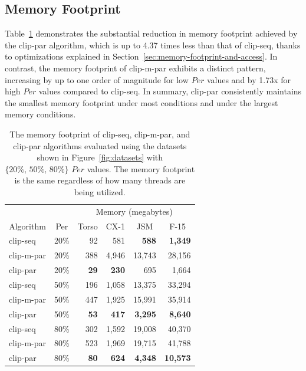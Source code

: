 \documentclass{egpubl}
\begin{document}
\subsection{Memory Footprint}

Table~\ref{tab:mem-footprint} demonstrates the substantial reduction in memory footprint achieved by the clip-par algorithm, which is up to 4.37 times less than that of clip-seq, thanks to optimizations explained in Section~\ref{sec:memory-footprint-and-access}. In contrast, the memory footprint of clip-m-par exhibits a distinct pattern, increasing by up to one order of magnitude for low $Per$ values and by 1.73x for high $Per$ values compared to clip-seq. In summary, clip-par consistently maintains the smallest memory footprint under most conditions and under the largest memory conditions.

\begin{table}[h]
\centering
\caption{The memory footprint of clip-seq, clip-m-par, and clip-par algorithms evaluated using the datasets shown in Figure~\ref{fig:datasets} with $\textit{\{20\%, 50\%, 80\%\}}$ $Per$ values. The memory footprint is the same regardless of how many threads are being utilized. }
\label{tab:mem-footprint}
\begin{tabular}{lc@{\quad}rrrr}
\toprule
\multicolumn{2}{l}{}                & \multicolumn{4}{c}{Memory (megabytes)}                                                                    \\
\multicolumn{1}{c}{Algorithm} & Per & \multicolumn{1}{c}{Torso} & \multicolumn{1}{c}{CX-1} & \multicolumn{1}{c}{JSM} & \multicolumn{1}{c}{F-15} \\
\midrule
clip-seq   & 20\% & 92        & 581        &\textbf{588}  &\textbf{1,349} \\
clip-m-par & 20\% & 388       & 4,946      & 13,743       & 28,156        \\
clip-par   & 20\% &\textbf{29}&\textbf{230}& 695          & 1,664         \\[1ex]
clip-seq   & 50\% & 196       & 1,058      & 13,375       & 33,294        \\
clip-m-par & 50\% & 447       & 1,925      & 15,991       & 35,914        \\
clip-par   & 50\% &\textbf{53}&\textbf{417}&\textbf{3,295}&\textbf{8,640} \\[1ex]
clip-seq   & 80\% & 302       & 1,592      & 19,008       & 40,370        \\
clip-m-par & 80\% & 523       & 1,969      & 19,715       & 41,788        \\
clip-par   & 80\% &\textbf{80}&\textbf{624}&\textbf{4,348}&\textbf{10,573}\\
\bottomrule
\end{tabular}
\end{table}
\end{document}
